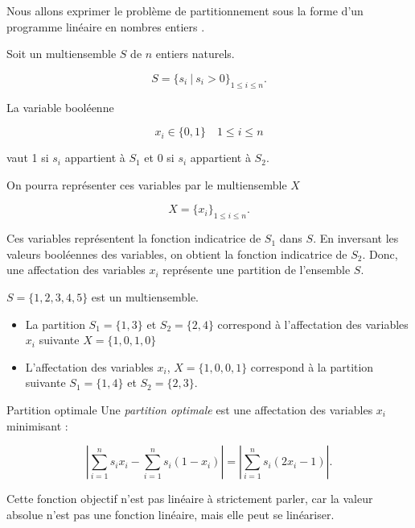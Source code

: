 \documentclass[11pt]{article}
\begin{document}
  Nous allons exprimer le problème de partitionnement sous la forme d'un programme linéaire en nombres entiers \cite{PLNE}.
  
  \begin{definition}{}
    Soit un multiensemble $S$ de $n$ entiers naturels. 

    $$S = \{s_i\ |\ s_i > 0\}_{1\leq i \leq n}.$$

    La variable booléenne 

    $$x_i \in \{0,1\} \quad 1 \leq i \leq n$$

    vaut 1 si $s_i$ appartient à $S_1$ et 0 si $s_i$ appartient à $S_2$.

    On pourra représenter ces variables par le multiensemble $X$ 

    $$X = \{x_i\}_{1\leq i \leq n}.$$
  \end{definition}

  Ces variables représentent la fonction indicatrice \cite{FI} de $S_1$ dans $S$.
  En inversant les valeurs booléennes des variables, on obtient la fonction indicatrice de $S_2$.
  Donc, une affectation des variables $x_i$ représente une partition de l'ensemble $S$. 
  
  \begin{exemple}{}
    $S = \{1,2,3,4,5\}$ est un multiensemble.

    \begin{itemize}
      \item La partition $S_1 = \{1,3\}$ et $S_2 = \{2,4\}$ correspond à l'affectation des variables $x_i$ suivante $X = \{1,0,1,0\}$
      \item L'affectation des variables $x_i$, $X = \{1,0,0,1\}$ correspond à la partition suivante $S_1 = \{1, 4\}$ et $S_2 = \{2,3\}$.
    \end{itemize}
  \end{exemple}
  
  \begin{definition}{Partition optimale}
    Une \emph{partition optimale} est une affectation des variables $x_i$ minimisant :
    
    $$\left| \sum_{i=1}^n s_i x_i  - \sum_{i=1}^n s_i(1-x_i) \right| 
    = 
    \left| \sum_{i=1}^n s_i (2x_i-1) \right|.$$

    Cette fonction objectif n'est pas linéaire à strictement parler, car la valeur absolue n'est pas une fonction linéaire, mais elle peut se linéariser.
  \end{definition}
\end{document}
